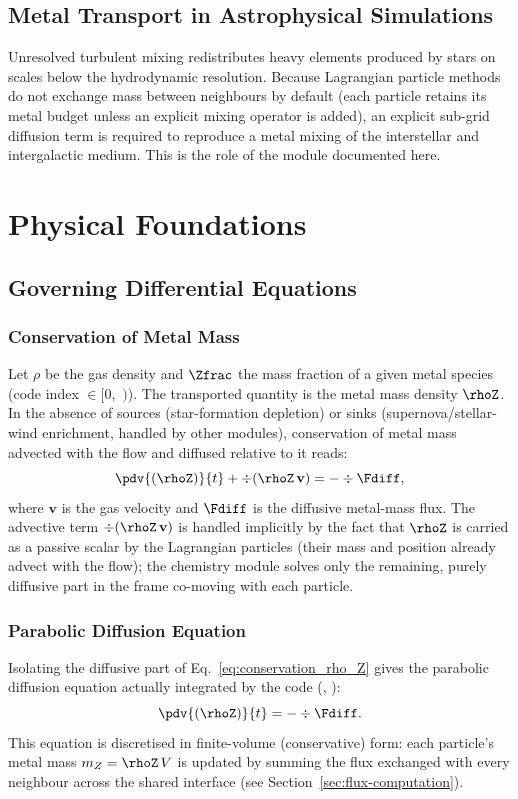 \subsection{Metal Transport in Astrophysical Simulations}
Unresolved turbulent mixing redistributes heavy elements produced by
stars on scales below the hydrodynamic resolution. Because Lagrangian
particle methods do not exchange mass between neighbours by default
(each particle retains its metal budget unless an explicit mixing
operator is added), an explicit sub-grid diffusion term is required to
reproduce a metal mixing of the interstellar and intergalactic medium.
This is the role of the module documented here.

\section{Physical Foundations}
\label{sec:physical-foundations}

\subsection{Governing Differential Equations}

\subsubsection{Conservation of Metal Mass}
Let $\rho$ be the gas density and $\Zfrac$ the mass fraction of a given
metal species (code index  $\in [0,$
$)$). The transported quantity is the
metal mass density $\rhoZ$. In the absence of sources (star-formation
depletion) or sinks (supernova/stellar-wind enrichment, handled by other
modules), conservation of metal mass advected with the flow and diffused
relative to it reads:
\begin{equation}
  \label{eq:conservation_rho_Z}
  \pdv{(\rhoZ)}{t} + \div (\rhoZ\, \mathbf{v}) = -\div \Fdiff ,
\end{equation}
where $\mathbf{v}$ is the gas velocity and $\Fdiff$ is the diffusive
metal-mass flux. The advective term $\div(\rhoZ\,\mathbf v)$ is handled
implicitly by the fact that $\rhoZ$ is carried as a passive scalar by the
Lagrangian particles (their mass and position already advect with the
flow); the chemistry module solves only the remaining, purely diffusive
part in the frame co-moving with each particle.

\subsubsection{Parabolic Diffusion Equation}
Isolating the diffusive part of Eq.~\eqref{eq:conservation_rho_Z} gives
the parabolic diffusion equation actually integrated by the code
(, ):
\begin{equation}
  \label{eq:parabolic_diffusion_rho_Z}
  \pdv{(\rhoZ)}{t} = -\div \Fdiff .
\end{equation}
This equation is discretised in finite-volume (conservative) form: each
particle's metal mass $m_Z = \rhoZ\, V$ is updated by summing the flux
exchanged with every neighbour across the shared interface (see
Section~\ref{sec:flux-computation}).

